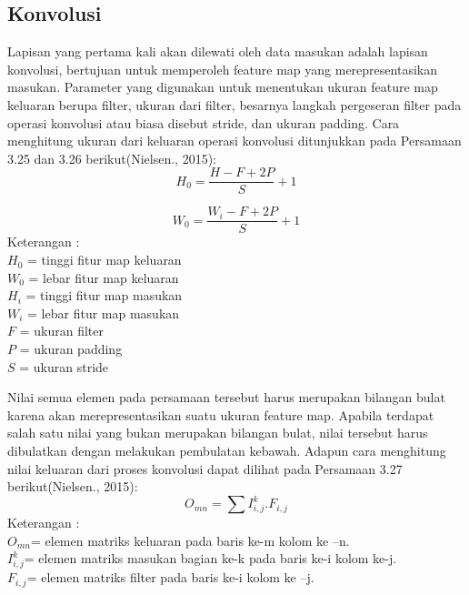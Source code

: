 \subsection{Konvolusi}
Lapisan yang pertama kali akan dilewati oleh data masukan adalah lapisan konvolusi, bertujuan untuk memperoleh feature map yang merepresentasikan masukan. Parameter yang digunakan untuk menentukan ukuran feature map keluaran berupa filter, ukuran dari filter, besarnya langkah pergeseran filter pada operasi konvolusi atau biasa disebut stride, dan ukuran padding. Cara menghitung ukuran dari keluaran operasi konvolusi ditunjukkan pada Persamaan 3.25 dan 3.26  berikut(Nielsen., 2015):
\begin{equation}
H_0 = \frac{H-F+2P}{S}+1
\end{equation}

\begin{equation}
W_0 = \frac{W_i-F+2P}{S}+1
\end{equation}
Keterangan : \\
\(H_0\) = tinggi fitur map keluaran
\\
\(W_0\) = lebar fitur map keluaran\\
\(H_i\) = tinggi fitur map masukan
\\
\(W_i\) = lebar fitur map masukan
\\
\(F\)  = ukuran filter
\\
\(P\)  = ukuran padding
\\
\(S\)  = ukuran stride 

Nilai semua elemen pada persamaan tersebut harus merupakan bilangan bulat karena akan merepresentasikan suatu ukuran feature map. Apabila terdapat salah satu nilai yang bukan merupakan bilangan bulat, nilai tersebut harus dibulatkan dengan melakukan pembulatan kebawah. Adapun cara menghitung nilai keluaran dari proses konvolusi dapat dilihat pada Persamaan 3.27 berikut(Nielsen., 2015):
\begin{equation}
O_{mn}=\sum I^k_{i,j} . F_{i,j}
\end{equation}
Keterangan :
\\
\(O_{mn}\)= elemen matriks keluaran pada baris ke-m kolom ke –n.
\\
\(I^k_{i,j}\)= elemen matriks masukan bagian ke-k pada baris ke-i kolom ke-j. 
\\
\(F_{i,j}\)= elemen matriks filter pada baris ke-i kolom ke –j.
